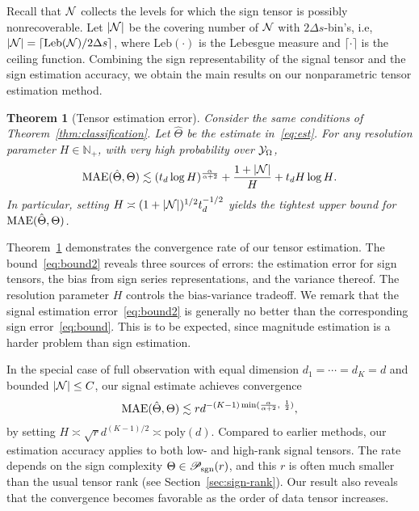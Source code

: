 \documentclass{article}
\theoremstyle{plain}
\newtheorem{thm}{Theorem}
\theoremstyle{definition}
\def\caliP{\mathscr{P}_{\textup{sgn}}}
\begin{document}
Recall that $\mathcal{N}$ collects the levels for which the sign tensor is possibly nonrecoverable. Let $|\mathcal{N}|$ be the covering number of $\mathcal{N}$ with $2\Delta s$-bin's, i.e, $|\mathcal{N}| = \lceil \text{Leb}(\mathcal{N})/2\Delta s \rceil$, where $\text{Leb}(\cdot)$ is the Lebesgue measure and $\lceil \cdot \rceil$ is the ceiling function. Combining the sign representability of the signal tensor and the sign estimation accuracy, we obtain the main results on our nonparametric tensor estimation method. 


\begin{thm}[Tensor estimation error]\label{thm:estimation} Consider the same conditions of Theorem~\ref{thm:classification}. Let $\hat \Theta$ be the estimate in~\eqref{eq:est}. For any resolution parameter $H\in\mathbb{N}_{+}$, with very high probability over $\mathcal{Y}_\Omega$,
\begin{equation}\label{eq:bound2}
\textup{MAE}(\hat \Theta, \Theta)\lesssim (t_d\log H)^{\alpha\over \alpha+2}+{1+|\mathcal{N}|\over H}+{t_dH\log H}.
\end{equation}
In particular, setting $\footnotesize H\asymp (1+|\tN|)^{1/2} t_d^{-1/2}$ yields the tightest upper bound for $\textup{MAE}(\hat \Theta, \Theta)$.
\end{thm}

Theorem~\ref{thm:estimation} demonstrates the convergence rate of our tensor estimation. The bound~\eqref{eq:bound2} reveals three sources of errors: the estimation error for sign tensors, the bias from sign series representations, and the variance thereof. The resolution parameter $H$ controls the bias-variance tradeoff. We remark that the signal estimation error~\eqref{eq:bound2} is generally no better than the corresponding sign error~\eqref{eq:bound}. This is to be expected, since magnitude estimation is  a harder problem than sign estimation. 

In the special case of full observation with equal dimension $d_1=\cdots=d_K=d$ and bounded $|\mathcal{N}|\leq C$, our signal estimate achieves convergence
\begin{equation}
\textup{MAE}(\hat \Theta, \Theta)\lesssim rd^{-(K-1)\min({\alpha\over \alpha+2},\ {1\over 2})},
\end{equation}
by setting $H\asymp \sqrt{r}d^{(K-1)/2}\asymp \text{poly}(d)$. Compared to earlier methods, our estimation accuracy applies to both low- and high-rank signal tensors. The rate depends on the sign complexity $\Theta\in\caliP(r)$, and this $r$ is often much smaller than the usual tensor rank (see Section~\ref{sec:sign-rank}). Our result also reveals that the convergence becomes favorable as the order of data tensor increases. 
\end{document}
